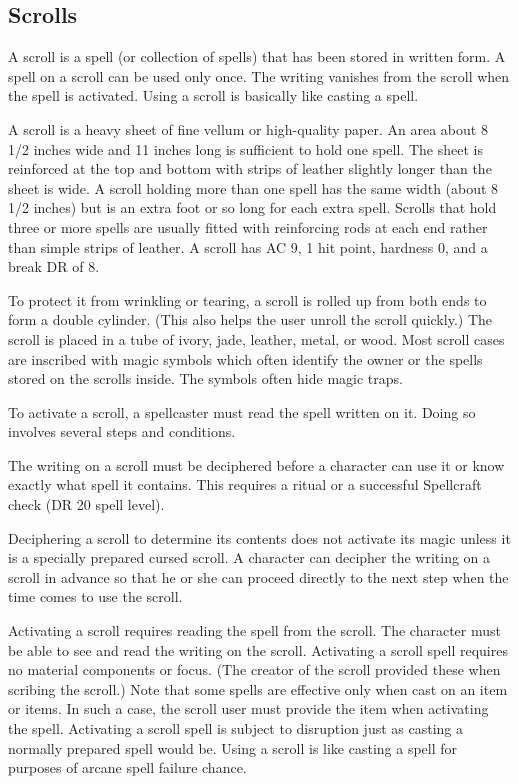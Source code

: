     \subsection{Scrolls}
        A scroll is a spell (or collection of spells) that has been stored in written form.
        A spell on a scroll can be used only once.
        The writing vanishes from the scroll when the spell is activated.
        Using a scroll is basically like casting a spell.

         A scroll is a heavy sheet of fine vellum or high-quality paper.
        An area about 8 1/2 inches wide and 11 inches long is sufficient to hold one spell.
        The sheet is reinforced at the top and bottom with strips of leather slightly longer than the sheet is wide.
        A scroll holding more than one spell has the same width (about 8 1/2 inches) but is an extra foot or so long for each extra spell.
        Scrolls that hold three or more spells are usually fitted with reinforcing rods at each end rather than simple strips of leather.
        A scroll has AC 9, 1 hit point, hardness 0, and a break DR of 8.

        To protect it from wrinkling or tearing, a scroll is rolled up from both ends to form a double cylinder.
        (This also helps the user unroll the scroll quickly.) The scroll is placed in a tube of ivory, jade, leather, metal, or wood.
        Most scroll cases are inscribed with magic symbols which often identify the owner or the spells stored on the scrolls inside.
        The symbols often hide magic traps.

         To activate a scroll, a spellcaster must read the spell written on it.
        Doing so involves several steps and conditions.

         The writing on a scroll must be deciphered before a character can use it or know exactly what spell it contains.
        This requires a  ritual or a successful Spellcraft check (DR 20 \add spell level).

        Deciphering a scroll to determine its contents does not activate its magic unless it is a specially prepared cursed scroll.
        A character can decipher the writing on a scroll in advance so that he or she can proceed directly to the next step when the time comes to use the scroll.

         Activating a scroll requires reading the spell from the scroll.
        The character must be able to see and read the writing on the scroll.
        Activating a scroll spell requires no material components or focus.
        (The creator of the scroll provided these when scribing the scroll.) Note that some spells are effective only when cast on an item or items.
        In such a case, the scroll user must provide the item when activating the spell.
        Activating a scroll spell is subject to disruption just as casting a normally prepared spell would be.
        Using a scroll is like casting a spell for purposes of arcane spell failure chance.

